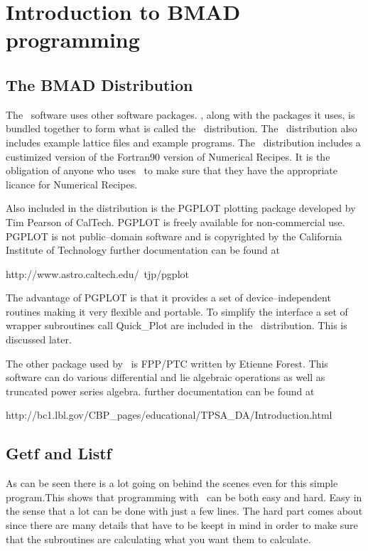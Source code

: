 \chapter{Introduction to BMAD programming}

\section{The BMAD Distribution}

The \bmad\ software uses other software packages. \bmad, along with the packages it uses, 
is bundled together to form what is called the \bmad\ distribution. The \bmad\ distribution
also includes example lattice files and example programs. The \bmad\ distribution includes a custimized version of the Fortran90 version of Numerical Recipes\cite{nr}. It is the obligation of anyone who uses \bmad\ to make sure that they have the appropriate licance for Numerical Recipes. 

Also included in the distribution is the PGPLOT plotting package developed by Tim Pearson of CalTech.
PGPLOT is freely available for non-commercial use. PGPLOT is not public--domain software and is copyrighted by the California Institute of Technology further documentation can be found at
\begin{example}
    http://www.astro.caltech.edu/~tjp/pgplot
\end{example}
The advantage of PGPLOT is that it provides a set of device--independent routines making it very flexible and portable. To simplify the interface a set of wrapper subroutines call Quick\_Plot are
included in the \bmad\ distribution. This is discussed later.

The other package used by \bmad\ is FPP/PTC written by Etienne Forest. This software can do 
various differential and lie algebraic operations as well as truncated power series algebra. further
documentation can be found at
\begin{example}
    http://bc1.lbl.gov/CBP_pages/educational/TPSA_DA/Introduction.html
\end{example}

\section{Getf and Listf}

As can be seen there is a lot going on behind the scenes even for this
simple program.This shows that programming with \bmad\ can be both easy
and hard. Easy in the sense that a lot can be done with just a few
lines. The hard part comes about since there are many details that
have to be keept in mind in order to make sure that the subroutines
are calculating what you want them to calculate.

